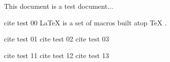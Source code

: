 \documentclass{article}
\begin{document}
This document is a test document...

cite test 00
\LaTeX{} \cite{lamport94} is a set of macros built atop \TeX{} \citep{texbook}.

cite test 01 \cite{ lamport94}
cite test 02 \cite{ texbook}
cite test 03 \cite{texbook }

cite test 11 \citep{ lamport94}
cite test 12 \citep{ texbook}
cite test 13 \citep{texbook }
\end{document}
